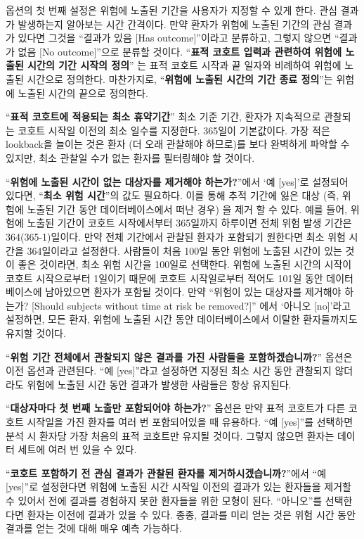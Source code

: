 \documentclass[11pt]{book}
\theoremstyle{definition}
\theoremstyle{definition}
\theoremstyle{definition}
\theoremstyle{remark}
\begin{document}
옵션의 첫 번째 설정은 위험에 노출된 기간을 사용자가 지정할 수 있게 한다.
관심 결과가 발생하는지 알아보는 시간 간격이다. 만약 환자가 위험에 노출된
기간의 관심 결과가 있다면 그것을 ``결과가 있음 {[}Has outcome{]}''이라고
분류하고, 그렇지 않으면 ``결과가 없음 {[}No outcome{]}''으로 분류할
것이다. ``\textbf{표적 코호트 입력과 관련하여 위험에 노출된 시간의 기간
시작의 정의}'' 는 표적 코호트 시작과 끝 일자와 비례하여 위험에 노출된
시간으로 정의한다. 마찬가지로, ``\textbf{위험에 노출된 시간의 기간 종료
정의}''는 위험에 노출된 시간의 끝으로 정의한다.

``\textbf{표적 코호트에 적용되는 최소 휴약기간}'' 최소 기준 기간, 환자가
지속적으로 관찰되는 코호트 시작일 이전의 최소 일수를 지정한다. 365일이
기본값이다. 가장 적은 lookback을 늘이는 것은 환자 (더 오래 관찰해야
하므로)를 보다 완벽하게 파악할 수 있지만, 최소 관찰일 수가 없는 환자를
필터링해야 할 것이다.

``\textbf{위험에 노출된 시간이 없는 대상자를 제거해야 하는가?}''에서 `예
{[}yes{]}'로 설정되어 있다면, ``\textbf{최소 위험 시간}''의 값도
필요하다. 이를 통해 추적 기간에 잃은 대상 (즉, 위험에 노출된 기간 동안
데이터베이스에서 떠난 경우) 을 제거 할 수 있다. 예를 들어, 위험에 노출된
기간이 코호트 시작에서부터 365일까지 하루이면 전체 위험 발생 기간은
364(365-1)일이다. 만약 전체 기간에서 관찰된 환자가 포함되기 원한다면
최소 위험 시간을 364일이라고 설정한다. 사람들이 처음 100일 동안 위험에
노출된 시간이 있는 것이 좋은 것이라면, 최소 위험 시간을 100일로
선택한다. 위험에 노출된 시간의 시작이 코호트 시작으로부터 1일이기 때문에
코호트 시작일로부터 적어도 101일 동안 데이터베이스에 남아있으면 환자가
포함될 것이다. 만약 ``위험이 있는 대상자를 제거해야 하는가? {[}Should
subjects without time at risk be removed?{]}'' 에서 `아니오
{[}no{]}'라고 설정하면, 모든 환자, 위험에 노출된 시간 동안
데이터베이스에서 이탈한 환자들까지도 유지할 것이다.

``\textbf{위험 기간 전체에서 관찰되지 않은 결과를 가진 사람들을
포함하겠습니까?}'' 옵션은 이전 옵션과 관련된다. ``예 {[}yes{]}''라고
설정하면 지정된 최소 시간 동안 관찰되지 않더라도 위험에 노출된 시간 동안
결과가 발생한 사람들은 항상 유지된다.

``\textbf{대상자마다 첫 번째 노출만 포함되어야 하는가?}'' 옵션은 만약
표적 코호트가 다른 코호트 시작일을 가진 환자를 여러 번 포함되어있을 때
유용하다. ``예 {[}yes{]}''를 선택하면 분석 시 환자당 가장 처음의 표적
코호트만 유지될 것이다. 그렇지 않으면 환자는 데이터 세트에 여러 번 있을
수 있다.

``\textbf{코호트 포함하기 전 관심 결과가 관찰된 환자를
제거하시겠습니까?}''에서 ``예 {[}yes{]}''로 설정한다면 위험에 노출된
시간 시작일 이전의 결과가 있는 환자들을 제거할 수 있어서 전에 결과를
경험하지 못한 환자들을 위한 모형이 된다. ``아니오''를 선택한다면 환자는
이전에 결과가 있을 수 있다. 종종, 결과를 미리 얻는 것은 위험 시간 동안
결과를 얻는 것에 대해 매우 예측 가능하다.
\end{document}
